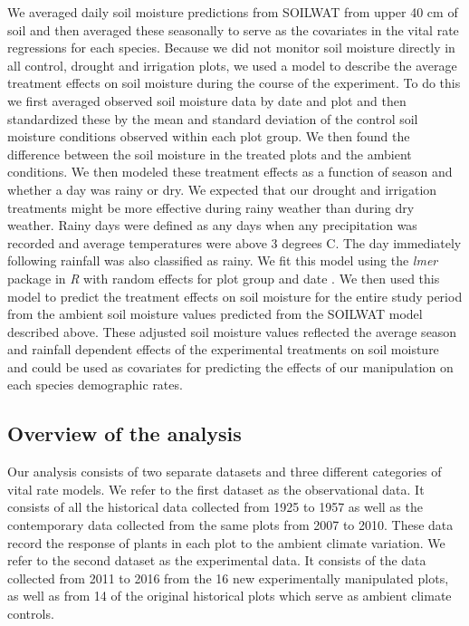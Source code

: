 \documentclass[11pt]{article}
\begin{document}
\begin{doublespace}
We averaged daily soil moisture predictions from SOILWAT from upper 40 cm of soil and then averaged these seasonally to serve as the covariates in the vital rate regressions for each species. Because we did not monitor soil moisture directly in all control, drought and irrigation plots, we used a model to describe the average treatment effects on soil moisture during the course of the experiment. To do this we first averaged observed soil moisture data by date and plot and then standardized these by the mean and standard deviation of the control soil moisture conditions observed within each plot group. We then found the difference between the soil moisture in the treated plots and the ambient conditions. We then modeled these treatment effects as a function of season and whether a day was rainy or dry. We expected that our drought and irrigation treatments might be more effective during rainy weather than during dry weather. Rainy days were defined as any days when any precipitation was recorded and average temperatures were above 3 degrees C. The day immediately following rainfall was also classified as rainy. We fit this model using the \textit{lmer} package in \textit{R} with random effects for plot group and date \citep{bates_fitting_2015}. We then used this model to predict the treatment effects on soil moisture for the entire study period from the ambient soil moisture values predicted from the SOILWAT model described above. These adjusted soil moisture values reflected the average season and rainfall dependent effects of the experimental treatments on soil moisture and could be used as covariates for predicting the effects of our manipulation on each species demographic rates. 


\subsection*{Overview of the analysis}

Our analysis consists of two separate datasets and three different categories of vital rate models. We refer to the first dataset as the observational data. It consists of all the historical data collected from 1925 to 1957 as well as the contemporary data collected from the same plots from 2007 to 2010. These data record the response of plants in each plot to the ambient climate variation. We refer to the second dataset as the experimental data.  It consists of the data collected from 2011 to 2016 from the 16 new experimentally manipulated plots, as well as from 14 of the original historical plots which serve as ambient climate controls.  


\end{doublespace}
\end{document}
